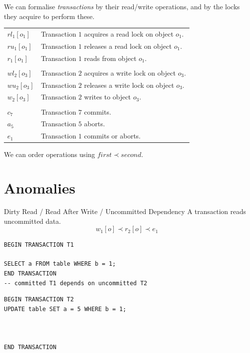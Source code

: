 \noindent We can formalise \textit{transactions} by their read/write operations, and by the locks they acquire to perform these.
\begin{center}
    \begin{tabular}{l l}
        $rl_1[o_1]$ & Transaction $1$ acquires a read lock on object $o_1$. \\
        $ru_1[o_1]$ & Transaction $1$ releases a read lock on object $o_1$. \\
        $r_1[o_1]$ & Transaction $1$ reads from object $o_1$. \\
        \\
        $wl_2[o_3]$ & Transaction $2$ acquires a write lock on object $o_3$. \\
        $wu_2[o_3]$ & Transaction $2$ releases a write lock on object $o_3$. \\
        $w_2[o_3]$ & Transaction $2$ writes to object $o_3$. \\
        \\
        $c_7$ & Transaction $7$ commits. \\
        $a_5$ & Transaction $5$ aborts. \\
        $e_1$ & Transaction $1$ commits or aborts. \\
    \end{tabular}
\end{center}
We can order operations using $first \prec second$.




\section{Anomalies}
\begin{definitionbox}{Dirty Read / Read After Write / Uncommitted Dependency}
    A transaction reads uncommitted data.
    \[w_1[o] \prec r_2[o] \prec e_1\]
    \tcblower
    \begin{minipage}[t]{.49\textwidth}
        \begin{verbatim}
BEGIN TRANSACTION T1

SELECT a FROM table WHERE b = 1;
END TRANSACTION
-- committed T1 depends on uncommitted T2
       \end{verbatim}
   \end{minipage} \hfill \begin{minipage}[t]{.49\textwidth}
       \begin{verbatim}
BEGIN TRANSACTION T2
UPDATE table SET a = 5 WHERE b = 1;



END TRANSACTION
       \end{verbatim}
   \end{minipage}
\end{definitionbox}

